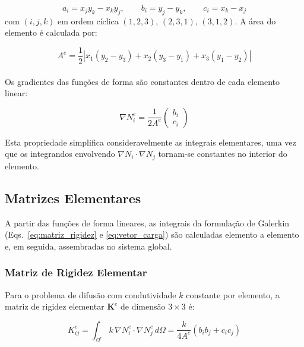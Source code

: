 \begin{equation}
a_i = x_j y_k - x_k y_j, \qquad b_i = y_j - y_k, \qquad c_i = x_k - x_j
\label{eq:coeficientes_p1}
\end{equation}
com $(i, j, k)$ em ordem cíclica $(1,2,3)$, $(2,3,1)$, $(3,1,2)$. A área do elemento é calculada por:

\begin{equation}
A^e = \frac{1}{2} \left| x_1(y_2 - y_3) + x_2(y_3 - y_1) + x_3(y_1 - y_2) \right|
\label{eq:area_elemento}
\end{equation}

\paragraph{}Os gradientes das funções de forma são constantes dentro de cada elemento linear:

\begin{equation}
\nabla N_i^e = \frac{1}{2A^e} \begin{pmatrix} b_i \\ c_i \end{pmatrix}
\label{eq:gradiente_p1}
\end{equation}

Esta propriedade simplifica consideravelmente as integrais elementares, uma vez que os integrandos envolvendo $\nabla N_i \cdot \nabla N_j$ tornam-se constantes no interior do elemento.

\subsection{Matrizes Elementares}
\label{sec:matrizes_elementares}

A partir das funções de forma lineares, as integrais da formulação de Galerkin (Eqs.~\ref{eq:matriz_rigidez} e \ref{eq:vetor_carga}) são calculadas elemento a elemento e, em seguida, assembradas no sistema global.

\subsubsection{Matriz de Rigidez Elementar}

Para o problema de difusão com condutividade $k$ constante por elemento, a matriz de rigidez elementar $\mathbf{K}^e$ de dimensão $3 \times 3$ é:

\begin{equation}
K_{ij}^e = \int_{\Omega^e} k \, \nabla N_i^e \cdot \nabla N_j^e \, d\Omega = \frac{k}{4A^e} (b_i b_j + c_i c_j)
\label{eq:rigidez_elementar}
\end{equation}

